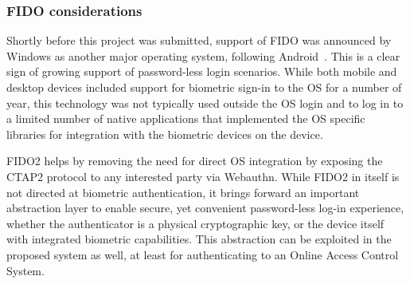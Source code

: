 \subsubsection*{FIDO considerations}
Shortly before this project was submitted, support of FIDO was announced by Windows as another major operating system, following Android~\cite{Mehta2019WindowsPasswordless}. This is a clear sign of growing support of password-less login scenarios. While both mobile and desktop devices included support for biometric sign-in to the OS for a number of year, this technology was not typically used outside the OS login and to log in to a limited number of native applications that implemented the OS specific libraries for integration with the biometric devices on the device.

FIDO2 helps by removing the need for direct OS integration by exposing the CTAP2 protocol to any interested party via Webauthn. While FIDO2 in itself is not directed at biometric authentication, it brings forward an important abstraction layer to enable secure, yet convenient password-less log-in experience, whether the authenticator is a physical cryptographic key, or the device itself with integrated biometric capabilities. This abstraction can be exploited in the proposed system as well, at least for authenticating to an Online Access Control System.